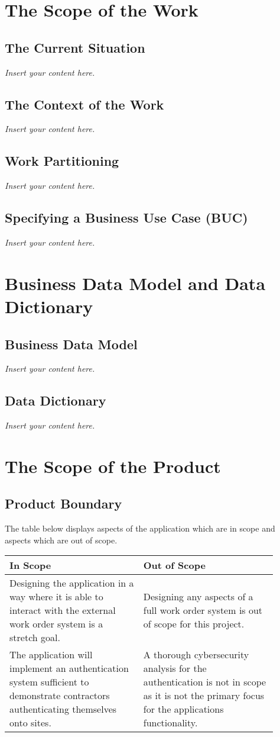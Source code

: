 \documentclass[12pt]{article}
\newcommand{\lips}{\textit{Insert your content here.}}
\begin{document}
\section{The Scope of the Work}
\subsection{The Current Situation}
\lips
\subsection{The Context of the Work}
\lips
\subsection{Work Partitioning}
\lips
\subsection{Specifying a Business Use Case (BUC)}
\lips

\section{Business Data Model and Data Dictionary}
\subsection{Business Data Model}
\lips
\subsection{Data Dictionary}
\lips

\section{The Scope of the Product}
\subsection{Product Boundary}

The table below displays aspects of the application which are in scope and
aspects which are out of scope. \\

\begin{tabular}{|p{0.45\linewidth}|p{0.45\linewidth}|}
\hline
\textbf{In Scope} & \textbf{Out of Scope} \\ 
\hline
Designing the application in a way where it is able to interact with the 
external work order system is a stretch goal.& Designing any aspects of a full 
work order system is out of scope for this project. \\
\hline
The application will implement an authentication system sufficient to 
demonstrate contractors authenticating themselves onto sites. & A thorough 
cybersecurity analysis for the authentication is not in scope as it is not the 
primary focus for the applications functionality. \\
\hline
\end{tabular}
\end{document}
